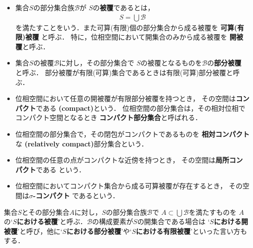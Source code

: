 	\begin{screen}
		\begin{dfn}\mbox{}
			\begin{itemize}
				\item
					集合$S$の部分集合族$\mathscr{B}$が
					$S$の{\bf 被覆}であるとは，
					\begin{align}
						S = \bigcup \mathscr{B}
					\end{align}
					を満たすことをいう．また可算(有限)個の部分集合から成る被覆を
					{\bf 可算(有限)被覆}
					と呼ぶ．
					特に，位相空間において開集合のみから成る被覆を
					{\bf 開被覆}と呼ぶ．
				
				\item 集合$S$の被覆$\mathscr{B}$に対し，その部分集合で
					$S$の被覆となるものを$\mathscr{B}$の{\bf 部分被覆}
					と呼ぶ．
					部分被覆が有限(可算)集合であるときは有限(可算)部分被覆と呼ぶ．
				\item 
					位相空間において任意の開被覆が有限部分被覆を持つとき，
					その空間は{\bf コンパクト}である
					{\bf (compact)}という．
					位相空間の部分集合は，その相対位相でコンパクト空間となるとき
					{\bf コンパクト部分集合}と呼ばれる．
				
				\item 位相空間の部分集合で，その閉包がコンパクトであるものを
					{\bf 相対コンパクト}な
					{\bf (relatively compact)}部分集合という．
				
				\item 位相空間の任意の点がコンパクトな近傍を持つとき，
					その空間は{\bf 局所コンパクト}である
					という．
					
				\item 位相空間においてコンパクト集合から成る可算被覆が存在するとき，
					その空間は{\bf $\sigma$-コンパクト}
					であるという．
			\end{itemize}
		\end{dfn}
	\end{screen}
	
	集合$S$とその部分集合$A$に対し，$S$の部分集合族$\mathscr{B}$で
	$A \subset \bigcup \mathscr{B}$を満たすものを
	$A$の`{\bf $S$における被覆}'と呼ぶ．$\mathscr{B}$の構成要素が$S$の開集合である場合は
	`{\bf $S$における開被覆}'と呼び，他に`{\bf $S$における部分被覆}'や`{\bf $S$における有限被覆}'といった言い方もする．
	
